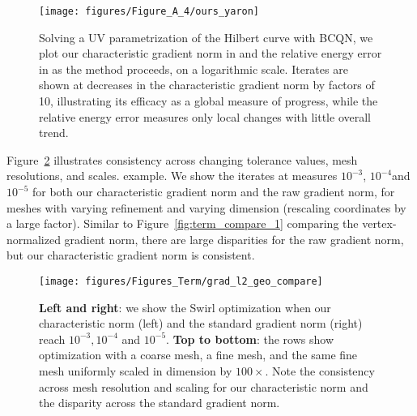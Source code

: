 \begin{figure}[h!]
\vspace{3mm}
\centering
\texttt{[image: figures/Figure\_A\_4/ours\_yaron]}
\caption{ 
Solving a UV parametrization of the Hilbert curve with BCQN, we plot our
characteristic gradient norm in  and the relative energy
error in  as the method proceeds, on a logarithmic scale.
Iterates are shown at decreases in the characteristic gradient norm
by factors of 10, illustrating its efficacy as a global measure of progress,
while the relative energy error measures only local changes with little
overall trend.}
\label{fig:ours_yaron}
\vspace{3mm}
\end{figure}

Figure~\ref{fig:term_compare_2} illustrates consistency across
changing tolerance values, mesh resolutions, and scales.
example.  We show the iterates at measures
$10^{-3}$, $10^{-4} $and $10^{-5}$ for both our characteristic gradient
norm and the raw gradient norm, for meshes with varying refinement and
varying dimension (rescaling coordinates by a large factor). Similar
to Figure~\ref{fig:term_compare_1} comparing the vertex-normalized gradient
norm, there are large disparities for the raw gradient norm, but our
characteristic gradient norm is consistent.

\begin{figure}[h!]
\vspace{3mm}
\centering
\texttt{[image: figures/Figures\_Term/grad\_l2\_geo\_compare]}
\caption{
{\bf Left and right}: we show the Swirl optimization
when our characteristic norm (left) and the standard gradient
norm (right) reach $10^{-3}, 10^{-4}$ and $10^{-5}$.
{\bf Top to bottom}: the rows show
optimization with a coarse mesh, a fine mesh, and the
same fine mesh uniformly scaled in dimension by $100\times$.
Note the consistency across mesh resolution and scaling
for our characteristic norm and
the disparity across the standard gradient norm.}
\label{fig:term_compare_2}
\end{figure}

